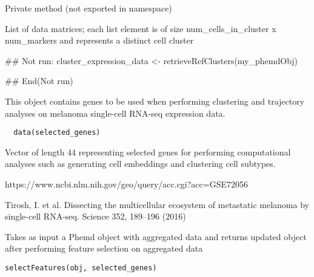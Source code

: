 \documentclass[a4paper]{book}
\begin{document}
%
\begin{Details}\relax
Private method (not exported in namespace)
\end{Details}
%
\begin{Value}
List of data matrices; each list element is of size num\_cells\_in\_cluster x num\_markers and represents a distinct cell cluster
\end{Value}
%
\begin{Examples}
\begin{ExampleCode}
## Not run: 
cluster_expression_data <- retrieveRefClusters(my_phemdObj)

## End(Not run)

\end{ExampleCode}
\end{Examples}
%
\begin{Description}\relax
This object contains genes to be used when performing clustering and trajectory analyses on melanoma single-cell RNA-seq expression data.
\end{Description}
%
\begin{Usage}
\begin{verbatim}
  data(selected_genes)
\end{verbatim}
\end{Usage}
%
\begin{Format}
Vector of length 44 representing selected genes for performing computational analyses such as generating cell embeddings and clustering cell subtypes.
\end{Format}
%
\begin{Source}\relax
https://www.ncbi.nlm.nih.gov/geo/query/acc.cgi?acc=GSE72056
\end{Source}
%
\begin{References}\relax
Tirosh, I. et al. Dissecting the multicellular ecosystem of metastatic melanoma by single-cell RNA-seq. Science 352, 189–196 (2016)
\end{References}
%
\begin{Description}\relax
Takes as input a Phemd object with aggregated data and returns updated object after performing feature selection on aggregated data
\end{Description}
%
\begin{Usage}
\begin{verbatim}
selectFeatures(obj, selected_genes)
\end{verbatim}
\end{Usage}
\end{document}

